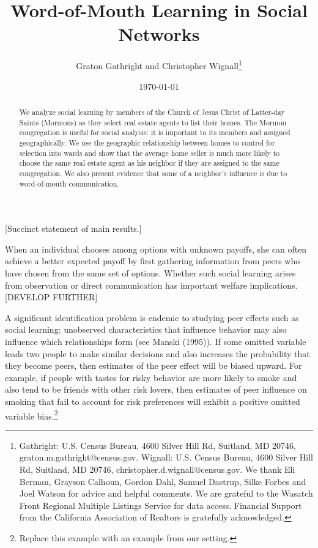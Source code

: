 \documentclass[AEJ,draftmode]{AEA}
\begin{document}
\title{Word-of-Mouth Learning in Social Networks}
\author{Graton Gathright and Christopher Wignall\thanks{%
Gathright: U.S. Census Bureau, 4600 Silver Hill Rd, Suitland, MD 20746, graton.m.gathright@census.gov. Wignall: U.S. Census Bureau, 4600 Silver Hill Rd, Suitland, MD 20746, christopher.d.wignall@census.gov. We thank Eli Berman, Grayson Calhoun, Gordon Dahl, Samuel Dastrup, Silke Forbes and Joel Watson for advice and helpful comments.  We are grateful to the Wasatch Front Regional Multiple Listings Service for data access.  Financial Support from the California Association of Realtors is gratefully acknowledged.}}
\date{\today}
\JEL{}
\Keywords{}

\begin{abstract}
We analyze social learning by members of the Church of Jesus Christ of Latter-day Saints (Mormons) as they select real estate agents to list their homes. The Mormon congregation is useful for social analysis: it is important to its members and assigned geographically. We use the geographic relationship between homes to control for selection into wards and show that the average home seller is much more likely to choose the same real estate agent as his neighbor if they are assigned to the same congregation. We also present evidence that some of a neighbor's influence is due to word-of-mouth communication.
\end{abstract}

\maketitle

	[Succinct statement of main results.]

    When an individual chooses among options with unknown payoffs, she can often achieve a better expected payoff by first gathering information from peers who have chosen from the same set of options. Whether such social learning arises from observation or direct communication has important welfare implications. [DEVELOP FURTHER]
    
    A significant identification problem is endemic to studying peer effects such as social learning: unobserved characteristics that influence behavior may also influence which relationships form (see Manski (1995)). If some omitted variable leads two people to make similar decisions and also increases the probability that they become peers, then estimates of the peer effect will be biased upward. For example, if people with tastes for risky behavior are more likely to smoke and also tend to be friends with other risk lovers, then estimates of peer influence on smoking that fail to account for risk preferences will exhibit a positive omitted variable bias.\footnote{Replace this example with an example from our setting.}
\end{document}
